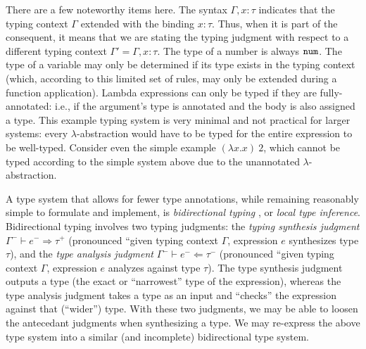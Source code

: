 There are a few noteworthy items here. The syntax $\Gamma,x:\tau$ indicates that the typing context $\Gamma$ extended with the binding $x:\tau$. Thus, when it is part of the consequent, it means that we are stating the typing judgment with respect to a different typing context $\Gamma'=\Gamma,x:\tau$. The type of a number is always $\mathtt{num}$. The type of a variable may only be determined if its type exists in the typing context (which, according to this limited set of rules, may only be extended during a function application). Lambda expressions can only be typed if they are fully-annotated: i.e., if the argument's type is annotated and the body is also assigned a type. This example typing system is very minimal and not practical for larger systems: every $\lambda$-abstraction would have to be typed for the entire expression to be well-typed. Consider even the simple example $(\lambda x.x)\ 2$, which cannot be typed according to the simple system above due to the unannotated $\lambda$-abstraction.

A type system that allows for fewer type annotations, while remaining reasonably simple to formulate and implement, is \textit{bidirectional typing} \cite{Dunfield_2022,chlipala2005strict,pierce2000local}, or \textit{local type inference}. Bidirectional typing involves two typing judgments: the \textit{typing synthesis judgment} $\Gamma^-\vdash e^-\Rightarrow\tau^+$ (pronounced ``given typing context $\Gamma$, expression $e$ synthesizes type $\tau$), and the \textit{type analysis judgment} $\Gamma^-\vdash e^-\Leftarrow\tau^-$ (pronounced ``given typing context $\Gamma$, expression $e$ analyzes against type $\tau$). The type synthesis judgment outputs a type (the exact or ``narrowest'' type of the expression), whereas the type analysis judgment takes a type as an input and ``checks'' the expression against that (``wider'') type. With these two judgments, we may be able to loosen the antecedant judgments when synthesizing a type. We may re-express the above type system into a similar (and incomplete) bidirectional type system.

\begin{singlespace}
\end{singlespace}

